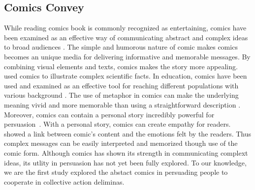 \subsection{Comics Convey}
While reading comics book is commonly recognized as entertaining, comics have been examined as an effective way of communicating abstract and complex ideas to broad audiences \textcite{McDermottPB18,cary2004going,scott1993understanding}. The simple and humorous nature of comic makes comics becomes an unique media for delivering informative and memorable messages. By combining visual elements and texts, comics makes the story more appealing. \textcite{McDermottPB18} used comics to illustrate complex scientific facts. In education, comics have been used and examined as an effective tool for reaching different populations with various background \textcite{McDermottPB18,cary2004going,scott1993understanding}. The use of metaphor in comics can make the underlying meaning vivid and more memorable than using a straightforward description \textcite{McDermottPB18,scott1993understanding}. Moreover, comics can contain a personal story incredibly powerful for persuasion~\textcite{weaver2017losing}. With a personal story, comics can create empathy for readers.~\textcite{matsubara2016emotional} showed a link between comic's content and the emotions felt by the readers. Thus complex messages can be easily interpreted and memorized though use of the comic form. Although comics has shown its strength in communicating complext ideas, its utlity in persuasion has not yet been fully explored. To our knowledge, we are the first study explored the abstact comics in persuading people to cooperate in collective action deliminas.  



